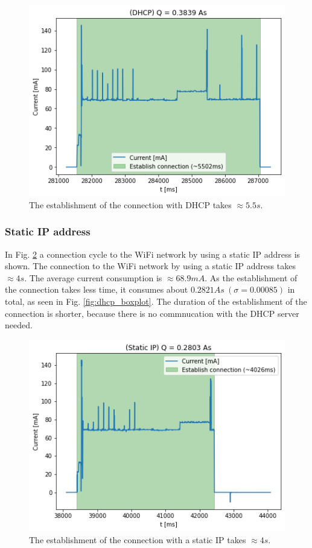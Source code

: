 \begin{figure}[H]
    \centering
    \includegraphics[width =\linewidth]{fig/dhcp.png}
    \caption{The establishment of the connection with DHCP takes $\approx 5.5s$.}
    \label{fig:dhcp}
\end{figure}

\subsubsection{Static IP address}
In Fig. \ref{fig:static_ip} a connection cycle to the WiFi network by using a static IP address is shown.
The connection to the WiFi network by using a static IP address takes $\approx 4 s$.
The average current consumption is $\approx 68.9 mA$.
As the establishment of the connection takes less time, it consumes about $0.2821 As\ (\sigma = 0.00085)$  in total, as seen in Fig. \ref{fig:dhcp_boxplot}.
The duration of the establishment of the connection is shorter, because there is no commnucation with the DHCP server needed.

\begin{figure}[H]
    \centering
    \includegraphics[width =\linewidth]{fig/static_ip.png}
    \caption{The establishment of the connection with a static IP takes $\approx 4s$.}
    \label{fig:static_ip}
\end{figure}

